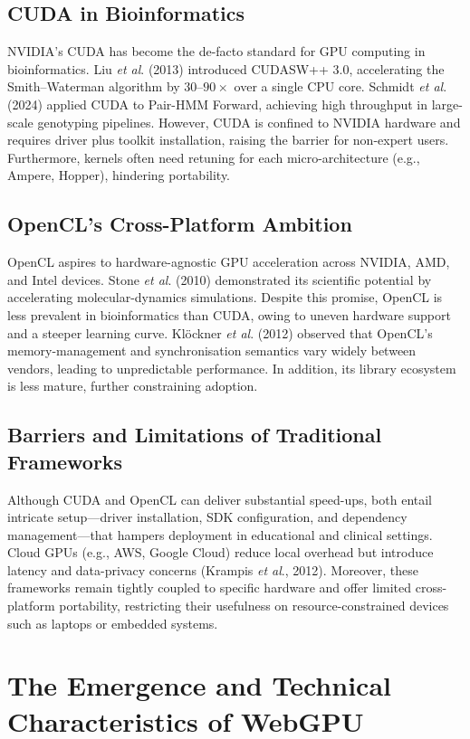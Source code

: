 \documentclass[PhD]{PHlab-thesis}
\begin{document}
\subsection{CUDA in Bioinformatics}
NVIDIA's CUDA has become the de-facto standard for GPU computing in bioinformatics. Liu \emph{et al}. (2013) introduced CUDASW++ 3.0, accelerating the Smith–Waterman algorithm by $30$–$90\times$ over a single CPU core. Schmidt \emph{et al}. (2024) applied CUDA to Pair-HMM Forward, achieving high throughput in large-scale genotyping pipelines. However, CUDA is confined to NVIDIA hardware and requires driver plus toolkit installation, raising the barrier for non-expert users. Furthermore, kernels often need retuning for each micro-architecture (e.g., Ampere, Hopper), hindering portability.

\subsection{OpenCL's Cross-Platform Ambition}
OpenCL aspires to hardware-agnostic GPU acceleration across NVIDIA, AMD, and Intel devices. Stone \emph{et al}. (2010) demonstrated its scientific potential by accelerating molecular-dynamics simulations. Despite this promise, OpenCL is less prevalent in bioinformatics than CUDA, owing to uneven hardware support and a steeper learning curve. Klöckner \emph{et al}. (2012) observed that OpenCL's memory-management and synchronisation semantics vary widely between vendors, leading to unpredictable performance. In addition, its library ecosystem is less mature, further constraining adoption.

\subsection{Barriers and Limitations of Traditional Frameworks}
Although CUDA and OpenCL can deliver substantial speed-ups, both entail intricate setup—driver installation, SDK configuration, and dependency management—that hampers deployment in educational and clinical settings. Cloud GPUs (e.g., AWS, Google Cloud) reduce local overhead but introduce latency and data-privacy concerns (Krampis \emph{et al}., 2012). Moreover, these frameworks remain tightly coupled to specific hardware and offer limited cross-platform portability, restricting their usefulness on resource-constrained devices such as laptops or embedded systems.


\section{The Emergence and Technical Characteristics of WebGPU}
\end{document}
